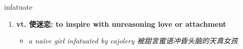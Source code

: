 
\begin{frame}
{\huge infatuate}
\begin{center}
\begin{enumerate}\Large
  \item \textbf{vt. 使迷恋: to inspire with unreasoning love or attachment}
  \begin{itemize}
    \item \em{\Large{a naïve girl infatuated by cajolery 被甜言蜜语冲昏头脑的天真女孩}}
  \end{itemize}
\end{enumerate}
\end{center}
\end{frame}
